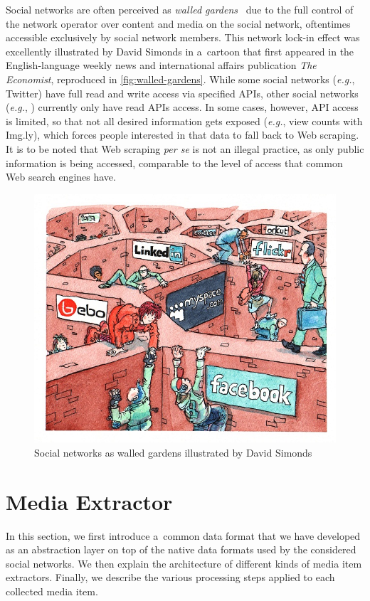 Social networks are often perceived as
\emph{walled gardens}~\cite{simonds2008walledgarden}
due to the full control of the network operator
over content and media on the social network,
oftentimes accessible exclusively by social network members.
This network lock-in effect was excellently illustrated
by David Simonds in a~cartoon that first appeared
in the English-language weekly news and
international affairs publication \emph{The Economist},
reproduced in \autoref{fig:walled-gardens}.
While some social networks (\emph{e.g.}, Twitter)
have full read and write access via specified APIs,
other social networks (\emph{e.g.}, \googleplus)
currently only have read APIs access.
In some cases, however, API access is limited,
so that not all desired information gets exposed
(\emph{e.g.}, view counts with Img.ly),
which forces people interested in that data
to fall back to Web scraping.
It is to be noted that Web scraping \emph{per se}
is not an illegal practice, as only public information is being accessed,
comparable to the level of access that common Web search engines have.

\begin{figure}[!ht]
  \centering
  \includegraphics[width=0.7\linewidth,
    trim=16px 17px 12px 15px,clip]{davidsimonds.jpg}
  \caption[Social networks as walled
    gardens illustrated by David Simonds]
    {Social networks as walled gardens illustrated by David Simonds}
  \label{fig:walled-gardens}
\end{figure}

\section{Media Extractor}
\label{sec:media-extractor}

In this section, we first introduce a~common data format
that we have developed as an abstraction layer on top of the native
data formats used by the considered social networks.
We then explain the architecture
of different kinds of media item extractors.
Finally, we describe the various processing steps
applied to each collected media item.

